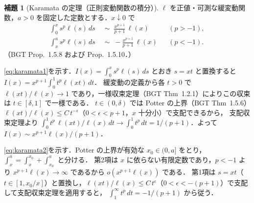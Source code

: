 \documentclass[a4paper,10pt]{jsarticle}
\makeatletter
\theoremstyle{definition}
\newtheorem{lemma}{補題}[section]
\renewenvironment{proof}[1][\proofname]{\par
  \pushQED{\qed}%
  \normalfont \topsep6\p@\@plus6\p@\relax
  \trivlist
  \item[\hskip\labelsep\textbf{#1}]\ignorespaces
}{%
  \popQED\endtrivlist\@endpefalse
}
\renewcommand{\proofname}{証明}
\makeatother
\begin{document}
\begin{lemma}[Karamata の定理（正則変動関数の積分）]
\label{lem:karamata}
$\ell$ を正値・可測な緩変動関数，$a>0$ を固定した定数とする．$x\downarrow0$ で
\begin{align}
  \int_0^x s^{p}\ell(s)\,ds&\;\sim\;\frac{x^{p+1}}{p+1}\,\ell(x)&&(p>-1),\label{eq:karamata1}\\
  \int_x^{a} s^{p}\ell(s)\,ds&\;\sim\;-\frac{x^{p+1}}{p+1}\,\ell(x)&&(p<-1).\label{eq:karamata2}
\end{align}
（BGT Prop.~1.5.8 および Prop.~1.5.10．）
\end{lemma}
\begin{proof}
\eqref{eq:karamata1}を示す．$I(x)=\int_0^x s^p\ell(s)\,ds$ とおき $s=xt$ と置換すると $I(x)=x^{p+1}\int_0^1 t^p\ell(xt)\,dt$．
緩変動の定義から各 $t>0$ で $\ell(xt)/\ell(x)\to1$ であり，一様収束定理（BGT Thm~1.2.1）によりこの収束は $t\in[\delta,1]$ で一様である．
$t\in(0,\delta)$ では Potter の上界（BGT Thm~1.5.6）$\ell(xt)/\ell(x)\le C\,t^{-\epsilon}$（$0<\epsilon<p+1$，$x$ 十分小）で支配できるから，
支配収束定理より $\int_0^1 t^p\,\ell(xt)/\ell(x)\,dt\to\int_0^1 t^p\,dt=1/(p+1)$．よって $I(x)\sim x^{p+1}\ell(x)/(p+1)$．

\eqref{eq:karamata2}を示す．Potter の上界が有効な $x_0\in(0,a]$ をとり，$\int_x^a=\int_x^{x_0}+\int_{x_0}^a$ と分ける．
第2項は $x$ に依らない有限定数であり，$p<-1$ より $x^{p+1}\ell(x)\to\infty$ であるから $o(x^{p+1}\ell(x))$ である．
第1項は $s=xt$（$t\in[1,x_0/x]$）と置換し，$\ell(xt)/\ell(x)\le C\,t^{\epsilon}$（$0<\epsilon<-(p+1)$）で支配して支配収束定理を適用すると，
$\int_1^\infty t^p\,dt=-1/(p+1)$ から従う．
\end{proof}
\end{document}

